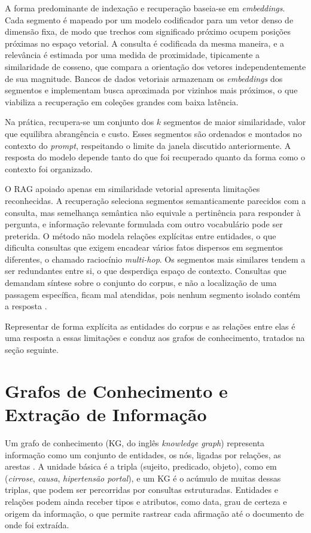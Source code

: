 A forma predominante de indexação e recuperação baseia-se em \textit{embeddings}. Cada segmento é mapeado por um modelo codificador para um vetor denso de dimensão fixa, de modo que trechos com significado próximo ocupem posições próximas no espaço vetorial. A consulta é codificada da mesma maneira, e a relevância é estimada por uma medida de proximidade, tipicamente a similaridade de cosseno, que compara a orientação dos vetores independentemente de sua magnitude. Bancos de dados vetoriais armazenam os \textit{embeddings} dos segmentos e implementam busca aproximada por vizinhos mais próximos, o que viabiliza a recuperação em coleções grandes com baixa latência.

Na prática, recupera-se um conjunto dos $k$ segmentos de maior similaridade, valor que equilibra abrangência e custo. Esses segmentos são ordenados e montados no contexto do \textit{prompt}, respeitando o limite da janela discutido anteriormente. A resposta do modelo depende tanto do que foi recuperado quanto da forma como o contexto foi organizado.

O RAG apoiado apenas em similaridade vetorial apresenta limitações reconhecidas. A recuperação seleciona segmentos semanticamente parecidos com a consulta, mas semelhança semântica não equivale a pertinência para responder à pergunta, e informação relevante formulada com outro vocabulário pode ser preterida. O método não modela relações explícitas entre entidades, o que dificulta consultas que exigem encadear vários fatos dispersos em segmentos diferentes, o chamado raciocínio \textit{multi-hop}. Os segmentos mais similares tendem a ser redundantes entre si, o que desperdiça espaço de contexto. Consultas que demandam síntese sobre o conjunto do corpus, e não a localização de uma passagem específica, ficam mal atendidas, pois nenhum segmento isolado contém a resposta \citep{gao2024,edge2024}.

Representar de forma explícita as entidades do corpus e as relações entre elas é uma resposta a essas limitações e conduz aos grafos de conhecimento, tratados na seção seguinte.

\section{Grafos de Conhecimento e Extração de Informação}\label{sec:kg}

Um grafo de conhecimento (KG, do inglês \textit{knowledge graph}) representa informação como um conjunto de entidades, os nós, ligadas por relações, as arestas \citep{hogan2021}. A unidade básica é a tripla (sujeito, predicado, objeto), como em (\textit{cirrose}, \textit{causa}, \textit{hipertensão portal}), e um KG é o acúmulo de muitas dessas triplas, que podem ser percorridas por consultas estruturadas. Entidades e relações podem ainda receber tipos e atributos, como data, grau de certeza e origem da informação, o que permite rastrear cada afirmação até o documento de onde foi extraída.

